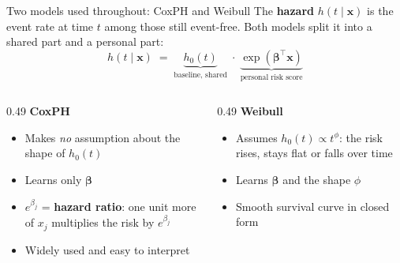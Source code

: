\begin{frame}{Two models used throughout: CoxPH and Weibull}
\small
\setlength{\abovedisplayskip}{4pt}\setlength{\belowdisplayskip}{4pt}
\setlength{\abovedisplayshortskip}{3pt}\setlength{\belowdisplayshortskip}{3pt}
The \textbf{hazard} $h(t \mid \bm{x})$ is the event rate at time $t$ among those still event-free.
Both models split it into a shared part and a personal part:
\[
  h(t \mid \bm{x}) \;=\; \underbrace{h_0(t)}_{\text{baseline, shared}} \;\cdot\; \underbrace{\exp(\bm{\beta}^\top \bm{x})}_{\text{personal risk score}}
\]
\vspace{0.3em}
\begin{columns}[T]
  \begin{column}{0.49\textwidth}
    \textbf{CoxPH} \cite{cox_regression_1972}
    \begin{itemize}
      \item Makes \emph{no} assumption about the shape of $h_0(t)$
      \item Learns only $\bm{\beta}$
      \item $e^{\beta_j}$ = \textbf{hazard ratio}: one unit more of $x_j$ multiplies the risk by $e^{\beta_j}$
      \item Widely used and easy to interpret
    \end{itemize}
  \end{column}
  \begin{column}{0.49\textwidth}
    \textbf{Weibull}
    \begin{itemize}
      \item Assumes $h_0(t) \propto t^{\phi}$: the risk rises, stays flat or falls over time
      \item Learns $\bm{\beta}$ and the shape $\phi$
      \item Smooth survival curve in closed form
    \end{itemize}
    \vspace{0.3em}
    \centering
  \end{column}
\end{columns}
\vspace{0.3em}
\end{frame}

